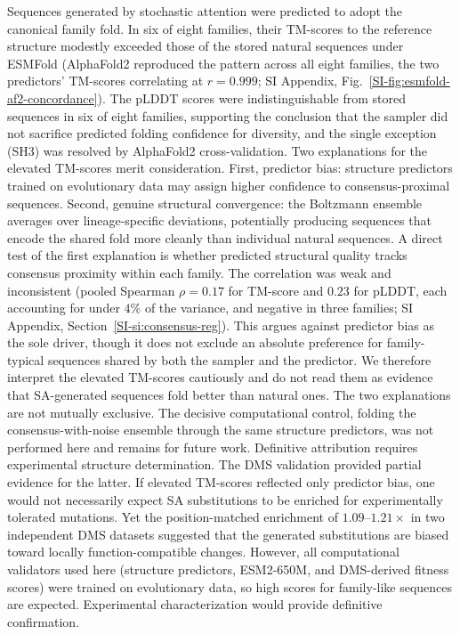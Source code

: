 \documentclass[11pt,onecolumn,twoside,lineno]{pnas-new}
\begin{document}
Sequences generated by stochastic attention were predicted to adopt the canonical family fold. In six of eight families, their TM-scores to the reference structure modestly exceeded those of the stored natural sequences under ESMFold (AlphaFold2 reproduced the pattern across all eight families, the two predictors' TM-scores correlating at $r{=}0.999$; SI Appendix, Fig.~\ref{SI-fig:esmfold-af2-concordance}). The pLDDT scores were indistinguishable from stored sequences in six of eight families, supporting the conclusion that the sampler did not sacrifice predicted folding confidence for diversity, and the single exception (SH3) was resolved by AlphaFold2 cross-validation. Two explanations for the elevated TM-scores merit consideration. First, predictor bias: structure predictors trained on evolutionary data may assign higher confidence to consensus-proximal sequences. Second, genuine structural convergence: the Boltzmann ensemble averages over lineage-specific deviations, potentially producing sequences that encode the shared fold more cleanly than individual natural sequences. A direct test of the first explanation is whether predicted structural quality tracks consensus proximity within each family. The correlation was weak and inconsistent (pooled Spearman $\rho{=}0.17$ for TM-score and $0.23$ for pLDDT, each accounting for under $4\%$ of the variance, and negative in three families; SI Appendix, Section~\ref{SI-si:consensus-reg}). This argues against predictor bias as the sole driver, though it does not exclude an absolute preference for family-typical sequences shared by both the sampler and the predictor. We therefore interpret the elevated TM-scores cautiously and do not read them as evidence that SA-generated sequences fold better than natural ones. The two explanations are not mutually exclusive. The decisive computational control, folding the consensus-with-noise ensemble through the same structure predictors, was not performed here and remains for future work. Definitive attribution requires experimental structure determination. The DMS validation provided partial evidence for the latter. If elevated TM-scores reflected only predictor bias, one would not necessarily expect SA substitutions to be enriched for experimentally tolerated mutations. Yet the position-matched enrichment of $1.09$--$1.21\times$ in two independent DMS datasets suggested that the generated substitutions are biased toward locally function-compatible changes. However, all computational validators used here (structure predictors, ESM2-650M, and DMS-derived fitness scores) were trained on evolutionary data, so high scores for family-like sequences are expected. Experimental characterization would provide definitive confirmation.
\end{document}
